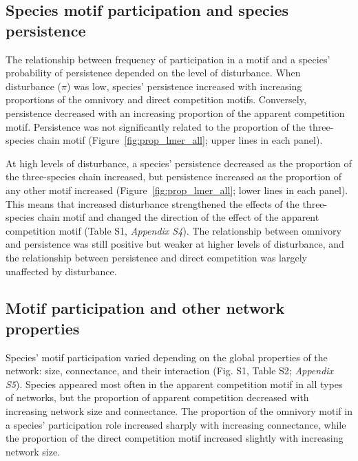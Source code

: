 \documentclass[12pt]{article}
\begin{document}
\begin{spacing}{2.0}
    \subsection*{Species motif participation and species persistence} 
       The relationship between frequency of participation in a motif and a species' probability of persistence depended on the level of disturbance. 
       When disturbance ($\pi$) was low, species' persistence increased with increasing proportions of the omnivory and direct competition motifs. 
       Conversely, persistence decreased with an increasing proportion of the apparent competition motif. 
       Persistence was not significantly related to the proportion of the three-species chain motif (Figure~\ref{fig:prop_lmer_all}; upper lines in each panel).
            
            
        At high levels of disturbance, a species' persistence decreased as the proportion of the three-species chain increased, but persistence increased as the proportion of any other motif increased (Figure~\ref{fig:prop_lmer_all}; lower lines in each panel). 
        This means that increased disturbance strengthened the effects of the three-species chain motif and changed the direction of the effect of the apparent competition motif  (Table S1, \emph{Appendix S4}).
        The relationship between omnivory and persistence was still positive but weaker at higher levels of disturbance, and the relationship between persistence and direct competition was largely unaffected by disturbance.

    \subsection*{Motif participation and other network properties}
       Species' motif participation varied depending on the global properties of the network: size, connectance, and their interaction (Fig. S1, Table S2; \emph{Appendix S5}).
       Species appeared most often in the apparent competition motif in all types of networks, but the proportion of apparent competition decreased with increasing network size and connectance.
       The proportion of the omnivory motif in a species' participation role increased sharply with increasing connectance, while the proportion of the direct competition motif increased slightly with increasing network size. 
        

\end{spacing}
\end{document}
